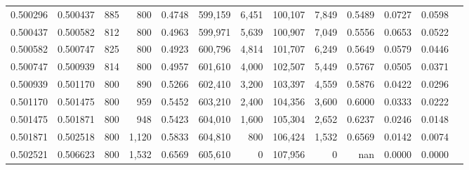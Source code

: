 \begin{tabular}{rrrrrrrrrrrrr}
0.500296 & 0.500437 &    885 &   800 &                                     0.4748 & 599,159 &   6,451 & 100,107 &   7,849 & 0.5489 & 0.0727 & 0.0598 \\
0.500437 & 0.500582 &    812 &   800 &                                     0.4963 & 599,971 &   5,639 & 100,907 &   7,049 & 0.5556 & 0.0653 & 0.0522 \\
0.500582 & 0.500747 &    825 &   800 &                                     0.4923 & 600,796 &   4,814 & 101,707 &   6,249 & 0.5649 & 0.0579 & 0.0446 \\
0.500747 & 0.500939 &    814 &   800 &                                     0.4957 & 601,610 &   4,000 & 102,507 &   5,449 & 0.5767 & 0.0505 & 0.0371 \\
0.500939 & 0.501170 &    800 &   890 &                                     0.5266 & 602,410 &   3,200 & 103,397 &   4,559 & 0.5876 & 0.0422 & 0.0296 \\
0.501170 & 0.501475 &    800 &   959 &                                     0.5452 & 603,210 &   2,400 & 104,356 &   3,600 & 0.6000 & 0.0333 & 0.0222 \\
0.501475 & 0.501871 &    800 &   948 &                                     0.5423 & 604,010 &   1,600 & 105,304 &   2,652 & 0.6237 & 0.0246 & 0.0148 \\
0.501871 & 0.502518 &    800 & 1,120 &                                     0.5833 & 604,810 &     800 & 106,424 &   1,532 & 0.6569 & 0.0142 & 0.0074 \\
0.502521 & 0.506623 &    800 & 1,532 &                                     0.6569 & 605,610 &       0 & 107,956 &       0 &    nan & 0.0000 & 0.0000 \\
\bottomrule
\end{tabular}
